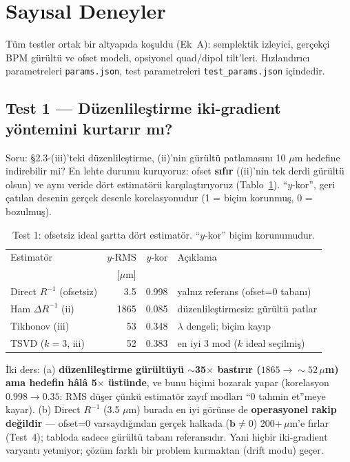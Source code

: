 \documentclass[twocolumn,a4paper,10pt]{article}
\begin{document}
\section{Sayısal Deneyler}
Tüm testler ortak bir altyapıda koşuldu (Ek~A): semplektik izleyici, gerçekçi
BPM gürültü ve ofset modeli, opsiyonel quad/dipol tilt'leri. Hızlandırıcı
parametreleri \texttt{params.json}, test parametreleri
\texttt{test\_params.json} içindedir.

\subsection{Test 1 --- Düzenlileştirme iki-gradient yöntemini kurtarır mı?}
Soru: \S2.3-(iii)'teki düzenlileştirme, (ii)'nin gürültü patlamasını 10 $\mu$m
hedefine indirebilir mi? En lehte durumu kuruyoruz: ofset \textbf{sıfır}
((ii)'nin tek derdi gürültü olsun) ve aynı veride dört estimatörü
karşılaştırıyoruz (Tablo~\ref{tab:t1}). ``$y$-kor'', geri çatılan desenin
gerçek desenle korelasyonudur (1 = biçim korunmuş, 0 = bozulmuş).

\begin{table}[tb]
\centering\small
\caption{Test 1: ofsetsiz ideal şartta dört estimatör. ``$y$-kor'' biçim
korunumudur.}
\label{tab:t1}
\begin{tabular}{@{}lrrl@{}}
\toprule
Estimatör & $y$-RMS & $y$-kor & Açıklama \\
          & [$\mu$m] &        &       \\
\midrule
Direct $R^{-1}$ (ofsetsiz) & 3.5  & 0.998 & yalnız referans (ofset=0 tabanı) \\
Ham $\Delta R^{-1}$ (ii)   & 1865 & 0.085 & düzenlileştirmesiz: gürültü patlar \\
Tikhonov (iii)             & 53   & 0.348 & $\lambda$ dengeli; biçim kayıp \\
TSVD ($k{=}3$, iii)        & 52   & 0.383 & en iyi 3 mod ($k$ ideal seçilmiş) \\
\bottomrule
\end{tabular}
\end{table}

İki ders: (a) \textbf{düzenlileştirme gürültüyü $\sim$35$\times$ bastırır
($1865\to\sim52\,\mu$m) ama hedefin hâlâ 5$\times$ üstünde}, ve bunu biçimi
bozarak yapar (korelasyon $0.998\to0.35$: RMS düşer çünkü estimatör zayıf modları
``0 tahmin et''meye kayar). (b) Direct $R^{-1}$ (3.5 $\mu$m) burada en iyi görünse de
\textbf{operasyonel rakip değildir} --- ofset=0 varsaydığından gerçek halkada
($\mathbf b\neq0$) 200+\,$\mu$m'e fırlar (Test~4); tabloda sadece gürültü tabanı
referansıdır. Yani hiçbir iki-gradient varyantı yetmiyor; çözüm farklı bir
problem kurmaktan (drift modu) geçer.
\end{document}
